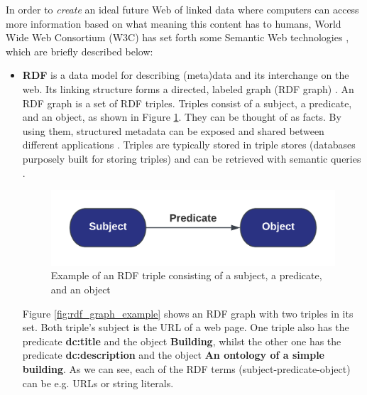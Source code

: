 \documentclass{article}
\begin{document}
In order to \emph{create} an ideal future Web of linked data where computers can access more information based on what meaning this content has to humans, World Wide Web Consortium (W3C) has set forth some Semantic Web technologies \cite{noauthor_semantic_nodate-1}, which are briefly described below:

\begin{itemize}
    \item \textbf{RDF} is a data model for describing (meta)data and its interchange on the web. Its linking structure forms a directed, labeled graph (RDF graph) \cite{sanga_spectral_2020, noauthor_sparql_nodate}. An RDF graph is a set of RDF triples. Triples consist of a subject, a predicate, and an object, as shown in Figure \ref{fig:rdf_triple_simple}. They can be thought of as facts. By using them, structured metadata can be exposed and shared between different applications \cite{noauthor_resource_nodate}. Triples are typically stored in triple stores (databases purposely built for storing triples) and can be retrieved with semantic queries \cite{noauthor_triple_nodate}.

    \begin{figure}[H]
        \centering
        \includegraphics[scale=0.16]{graphics/rdf_triple_simple.png}
        \caption{Example of an RDF triple consisting of a subject, a predicate, and an object}
        \label{fig:rdf_triple_simple}
    \end{figure}
    
    Figure \ref{fig:rdf_graph_example} shows an RDF graph with two triples in its set. Both triple's subject is the URL of a web page. One triple also has the predicate \textbf{dc:title} and the object \textbf{Building}, whilst the other one has the predicate \textbf{dc:description} and the object \textbf{An ontology of a simple building}. As we can see, each of the RDF terms (subject-predicate-object) can be e.g. URLs or string literals.
    

\end{itemize}
\end{document}
